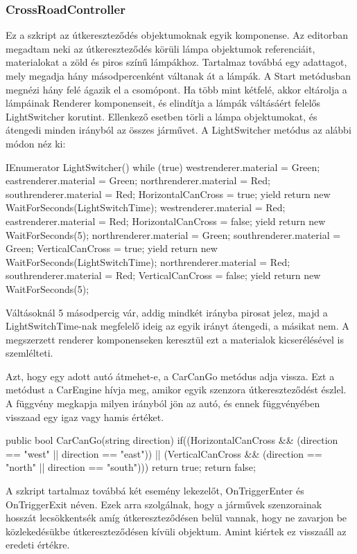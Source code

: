 \subsubsection{CrossRoadController}
Ez a szkript az útkereszteződés objektumoknak egyik komponense. Az editorban megadtam neki az útkereszteződés körüli lámpa objektumok referenciáit, materialokat a zöld és piros színű lámpákhoz. Tartalmaz továbbá egy adattagot, mely megadja hány másodpercenként váltanak át a lámpák.
A Start metódusban megnézi hány felé ágazik el a csomópont. Ha több mint kétfelé, akkor eltárolja a lámpáinak Renderer komponenseit, és elindítja a lámpák váltásáért felelős LightSwitcher korutint. Ellenkező esetben törli a lámpa objektumokat, és átengedi minden irányból az összes járművet.
A LightSwitcher metódus az alábbi módon néz ki:
\begin{cpp}
IEnumerator LightSwitcher()
    {
        while (true)
        {
            westrenderer.material = Green;
            eastrenderer.material = Green;
            northrenderer.material = Red;
            southrenderer.material = Red;
            HorizontalCanCross = true;
            yield return new WaitForSeconds(LightSwitchTime);
            westrenderer.material = Red;
            eastrenderer.material = Red;
            HorizontalCanCross = false;
            yield return new WaitForSeconds(5);
            northrenderer.material = Green;
            southrenderer.material = Green;
            VerticalCanCross = true;
            yield return new WaitForSeconds(LightSwitchTime);
            northrenderer.material = Red;
            southrenderer.material = Red;
            VerticalCanCross = false;
            yield return new WaitForSeconds(5);
        }
    }
\end{cpp}
Váltásoknál 5 másodpercig vár, addig mindkét irányba pirosat jelez, majd a LightSwitchTime-nak megfelelő ideig az egyik irányt átengedi, a másikat nem. A megszerzett renderer komponenseken keresztül ezt a materialok kicserélésével is szemlélteti.

Azt, hogy egy adott autó átmehet-e, a CarCanGo metódus adja vissza. Ezt a metódust a CarEngine hívja meg, amikor egyik szenzora útkereszteződést észlel. A függvény megkapja milyen irányból jön az autó, és ennek függvényében visszaad egy igaz vagy hamis értéket.
\begin{cpp}
public bool CarCanGo(string direction)
    {
        if((HorizontalCanCross && (direction == "west" 
        || direction == "east")) || (VerticalCanCross && 
        (direction == "north" || direction == "south")))
        {
            return true;
        }
        return false;
    }
\end{cpp}

A szkript tartalmaz továbbá két esemény lekezelőt, OnTriggerEnter és OnTriggerExit néven. Ezek arra szolgálnak, hogy a járművek szenzorainak hosszát lecsökkentsék amíg útkereszteződésen belül vannak, hogy ne zavarjon be közlekedésükbe útkereszteződésen kívüli objektum. Amint kiértek ez visszaáll az eredeti értékre.